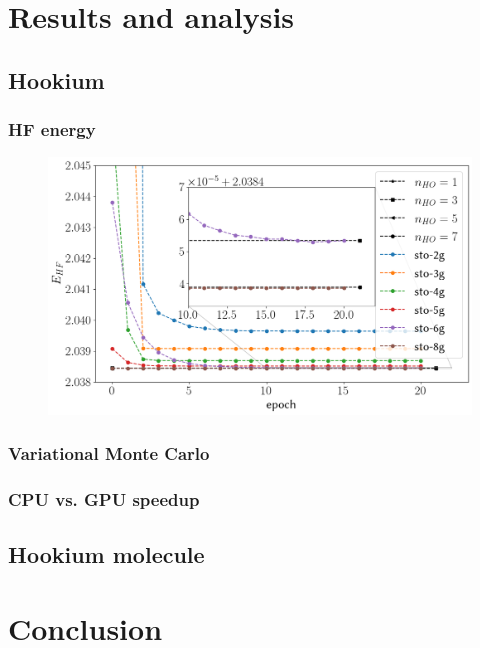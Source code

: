 \documentclass[final,3p,times,twocolumn]{elsarticle}
\begin{document}
	\section{Results and analysis}
	\label{sec:results}

	\subsection{Hookium}
	\subsubsection{HF energy}
	\begin{figure}[h]
		\centering
		\includegraphics[width=\linewidth]{../plots/HF_optimization}
		\caption{}
		\label{fig:hfoptimization}
	\end{figure}
	
	\subsubsection{Variational Monte Carlo}
	

	\subsubsection{CPU vs. GPU speedup}
	
	\subsection{Hookium molecule}
	
	
	\newpage
	\section{Conclusion}
	\label{sec:conclusion}
	
\end{document}
